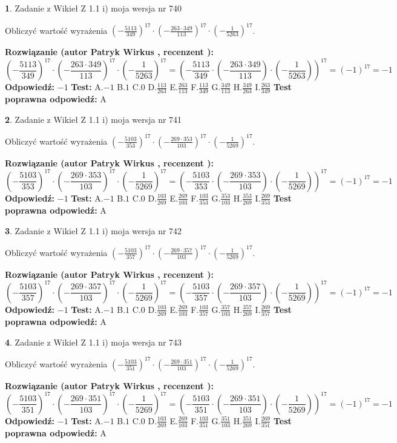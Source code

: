 \documentclass[12pt, a4paper]{article}
\theoremstyle{definition} %
\newtheorem{zad}{}
\newcommand{\zadStart}[1]{\begin{zad}#1\newline}
\newcommand{\zadStop}{\end{zad}}
\newcommand{\rozwStart}[2]{\noindent \textbf{Rozwiązanie (autor #1 , recenzent #2): }\newline}
\newcommand{\rozwStop}{\newline}
\newcommand{\odpStart}{\noindent \textbf{Odpowiedź:}\newline}
\newcommand{\odpStop}{\newline}
\newcommand{\testStart}{\noindent \textbf{Test:}\newline}
\newcommand{\testStop}{\newline}
\newcommand{\kluczStart}{\noindent \textbf{Test poprawna odpowiedź:}\newline}
\newcommand{\kluczStop}{\newline}
\begin{document}
\zadStart{Zadanie z Wikieł Z 1.1 i) moja wersja nr 740}

Obliczyć wartość wyrażenia $(-\frac{5113}{349})^{17} \cdot (-\frac{263 \cdot 349}{113})^{17} \cdot (-\frac{1}{5263})^{17}$.
\zadStop
\rozwStart{Patryk Wirkus}{}
$$(-\frac{5113}{349})^{17} \cdot (-\frac{263 \cdot 349}{113})^{17} \cdot (-\frac{1}{5263})^{17} = (-\frac{5113}{349} \cdot (-\frac{263 \cdot 349}{113}) \cdot (-\frac{1}{5263}))^{17} = (-1)^{17} = -1$$
\rozwStop
\odpStart
$-1$
\odpStop
\testStart
A.$-1$ B.$1$ C.$0$ D.$\frac{113}{263}$ E.$\frac{263}{113}$
F.$\frac{113}{349}$ G.$\frac{349}{113}$
H.$\frac{349}{263}$
I.$\frac{263}{349}$
\testStop
\kluczStart
A
\kluczStop



\zadStart{Zadanie z Wikieł Z 1.1 i) moja wersja nr 741}

Obliczyć wartość wyrażenia $(-\frac{5103}{353})^{17} \cdot (-\frac{269 \cdot 353}{103})^{17} \cdot (-\frac{1}{5269})^{17}$.
\zadStop
\rozwStart{Patryk Wirkus}{}
$$(-\frac{5103}{353})^{17} \cdot (-\frac{269 \cdot 353}{103})^{17} \cdot (-\frac{1}{5269})^{17} = (-\frac{5103}{353} \cdot (-\frac{269 \cdot 353}{103}) \cdot (-\frac{1}{5269}))^{17} = (-1)^{17} = -1$$
\rozwStop
\odpStart
$-1$
\odpStop
\testStart
A.$-1$ B.$1$ C.$0$ D.$\frac{103}{269}$ E.$\frac{269}{103}$
F.$\frac{103}{353}$ G.$\frac{353}{103}$
H.$\frac{353}{269}$
I.$\frac{269}{353}$
\testStop
\kluczStart
A
\kluczStop



\zadStart{Zadanie z Wikieł Z 1.1 i) moja wersja nr 742}

Obliczyć wartość wyrażenia $(-\frac{5103}{357})^{17} \cdot (-\frac{269 \cdot 357}{103})^{17} \cdot (-\frac{1}{5269})^{17}$.
\zadStop
\rozwStart{Patryk Wirkus}{}
$$(-\frac{5103}{357})^{17} \cdot (-\frac{269 \cdot 357}{103})^{17} \cdot (-\frac{1}{5269})^{17} = (-\frac{5103}{357} \cdot (-\frac{269 \cdot 357}{103}) \cdot (-\frac{1}{5269}))^{17} = (-1)^{17} = -1$$
\rozwStop
\odpStart
$-1$
\odpStop
\testStart
A.$-1$ B.$1$ C.$0$ D.$\frac{103}{269}$ E.$\frac{269}{103}$
F.$\frac{103}{357}$ G.$\frac{357}{103}$
H.$\frac{357}{269}$
I.$\frac{269}{357}$
\testStop
\kluczStart
A
\kluczStop



\zadStart{Zadanie z Wikieł Z 1.1 i) moja wersja nr 743}

Obliczyć wartość wyrażenia $(-\frac{5103}{351})^{17} \cdot (-\frac{269 \cdot 351}{103})^{17} \cdot (-\frac{1}{5269})^{17}$.
\zadStop
\rozwStart{Patryk Wirkus}{}
$$(-\frac{5103}{351})^{17} \cdot (-\frac{269 \cdot 351}{103})^{17} \cdot (-\frac{1}{5269})^{17} = (-\frac{5103}{351} \cdot (-\frac{269 \cdot 351}{103}) \cdot (-\frac{1}{5269}))^{17} = (-1)^{17} = -1$$
\rozwStop
\odpStart
$-1$
\odpStop
\testStart
A.$-1$ B.$1$ C.$0$ D.$\frac{103}{269}$ E.$\frac{269}{103}$
F.$\frac{103}{351}$ G.$\frac{351}{103}$
H.$\frac{351}{269}$
I.$\frac{269}{351}$
\testStop
\kluczStart
A
\kluczStop
\end{document}
